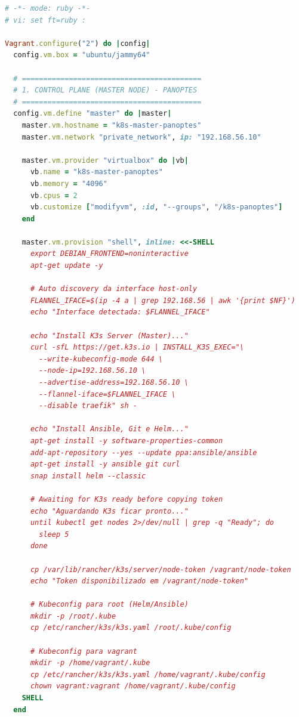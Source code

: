 \begin{lstlisting}[language=Ruby, caption={Vagrantfile configuration for Scenario 2 (PANOPTES Architecture)}, label={lst:vagrant-scenario2}]
# -*- mode: ruby -*-
# vi: set ft=ruby :

Vagrant.configure("2") do |config|
  config.vm.box = "ubuntu/jammy64"

  # ==========================================
  # 1. CONTROL PLANE (MASTER NODE) - PANOPTES
  # ==========================================
  config.vm.define "master" do |master|
    master.vm.hostname = "k8s-master-panoptes"
    master.vm.network "private_network", ip: "192.168.56.10"

    master.vm.provider "virtualbox" do |vb|
      vb.name = "k8s-master-panoptes"
      vb.memory = "4096"
      vb.cpus = 2
      vb.customize ["modifyvm", :id, "--groups", "/k8s-panoptes"]
    end

    master.vm.provision "shell", inline: <<-SHELL
      export DEBIAN_FRONTEND=noninteractive
      apt-get update -y

      # Auto discovery da interface host-only
      FLANNEL_IFACE=$(ip -4 a | grep 192.168.56 | awk '{print $NF}')
      echo "Interface detectada: $FLANNEL_IFACE"

      echo "Install K3s Server (Master)..."
      curl -sfL https://get.k3s.io | INSTALL_K3S_EXEC="\
        --write-kubeconfig-mode 644 \
        --node-ip=192.168.56.10 \
        --advertise-address=192.168.56.10 \
        --flannel-iface=$FLANNEL_IFACE \
        --disable traefik" sh -

      echo "Install Ansible, Git e Helm..."
      apt-get install -y software-properties-common
      add-apt-repository --yes --update ppa:ansible/ansible
      apt-get install -y ansible git curl
      snap install helm --classic

      # Awaiting for K3s ready before copying token
      echo "Aguardando K3s ficar pronto..."
      until kubectl get nodes 2>/dev/null | grep -q "Ready"; do
        sleep 5
      done

      cp /var/lib/rancher/k3s/server/node-token /vagrant/node-token
      echo "Token disponibilizado em /vagrant/node-token"

      # Kubeconfig para root (Helm/Ansible)
      mkdir -p /root/.kube
      cp /etc/rancher/k3s/k3s.yaml /root/.kube/config

      # Kubeconfig para vagrant
      mkdir -p /home/vagrant/.kube
      cp /etc/rancher/k3s/k3s.yaml /home/vagrant/.kube/config
      chown vagrant:vagrant /home/vagrant/.kube/config
    SHELL
  end


\end{lstlisting}
